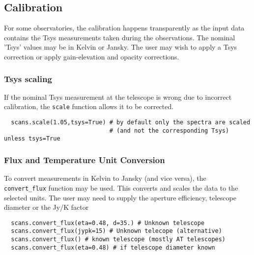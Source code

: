 \subsection{Calibration}
\label{subsection:sd.asap.calib}

For some observatories, the calibration happens transparently as the
input data contains the Tsys measurements taken during the
observations. The nominal 'Tsys' values may be in Kelvin or
Jansky. The user may wish to apply a Tsys correction or apply
gain-elevation and opacity corrections.

\subsubsection{Tsys scaling}
\label{subsubsection:sd.asap.calib.tsys}

If the nominal Tsys measurement at the telescope is wrong due to
incorrect calibration, the {\tt scale} function allows it to be corrected.  

\small
\begin{verbatim}
  scans.scale(1.05,tsys=True) # by default only the spectra are scaled
                              # (and not the corresponding Tsys) unless tsys=True
\end{verbatim}
\normalsize


\subsubsection{Flux and Temperature Unit Conversion}
\label{subsubsection:sd.asap.calib.fluxunit}

To convert measurements in Kelvin to Jansky (and vice versa), the {\tt
convert\_flux} function may be used. This converts and scales the data
to the selected units. The user may need to supply the aperture
efficiency, telescope diameter or the Jy/K factor

\small
\begin{verbatim}
  scans.convert_flux(eta=0.48, d=35.) # Unknown telescope
  scans.convert_flux(jypk=15) # Unknown telecope (alternative)
  scans.convert_flux() # known telescope (mostly AT telescopes)
  scans.convert_flux(eta=0.48) # if telescope diameter known
\end{verbatim}
\normalsize

